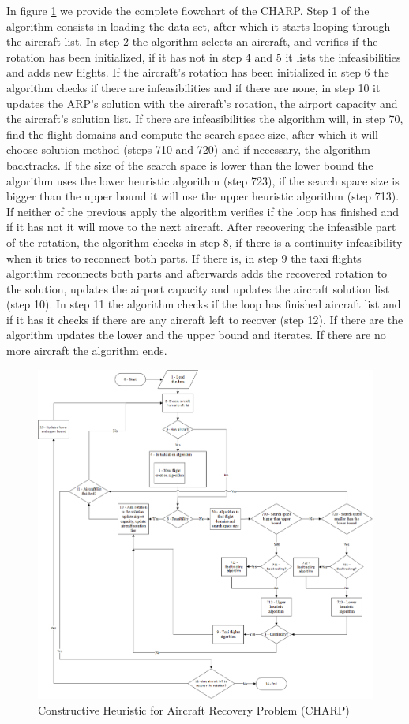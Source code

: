 In figure \ref{fig:mainAlgo} we provide the complete flowchart of the CHARP. Step 1 of the algorithm consists in loading the data set, after which it starts looping through the aircraft list. In step 2 the algorithm selects an aircraft, and verifies if the rotation has been initialized, if it has not in step 4 and 5 it lists the infeasibilities and adds new flights. If the aircraft's rotation has been initialized in step 6 the algorithm checks if there are infeasibilities and if there are none, in step 10 it updates the ARP's solution with the aircraft's rotation, the airport capacity and the aircraft's solution list. If there are infeasibilities the algorithm will, in step 70, find the flight domains and compute the search space size, after which it will choose solution method (steps 710 and 720) and if necessary, the algorithm backtracks.
If the size of the search space is lower than the lower bound the algorithm uses the lower heuristic algorithm (step 723), if the search space size is bigger than the upper bound it will use the upper heuristic algorithm (step 713). If neither of the previous apply the algorithm verifies if the loop has finished and if it has not it will move to the next aircraft. After recovering the infeasible part of the rotation, the algorithm checks in step 8, if there is a continuity infeasibility when it tries to reconnect both parts. If there is, in step 9 the taxi flights algorithm reconnects both parts and afterwards adds the recovered rotation to the solution, updates the airport capacity and updates the aircraft solution list (step 10). In step 11  the algorithm checks if the loop has finished aircraft list and if it has it checks if there are any aircraft left to recover (step 12). If there are the algorithm updates the lower and the upper bound and iterates. If there are no more aircraft the algorithm ends.

 \begin{figure}[h!]
	\centering
	\includegraphics[scale=0.65]{figures/mainAlgo.png}
	\caption[]{Constructive Heuristic for Aircraft Recovery Problem (CHARP)}
	\label{fig:mainAlgo}
\end{figure}

%
